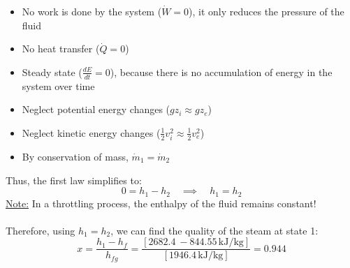 \documentclass[12pt]{article}
\begin{document}
\begin{itemize}
\item No work is done by the system ($\dot{W}=0$), it only reduces the pressure of the fluid
\item No heat transfer ($\dot{Q}=0$)
\item Steady state ($\frac{dE}{dt}=0$), because there is no accumulation of energy in the system over time
\item Neglect potential energy changes ($g z_i \approx g z_e$)
\item Neglect kinetic energy changes ($\frac{1}{2}v_i^2 \approx \frac{1}{2}v_e^2$)
\item By conservation of mass, $\dot{m}_1 = \dot{m}_2$
\end{itemize}
Thus, the first law simplifies to:
\[0 = h_1 - h_2 \quad \implies \quad h_1 = h_2\]
\underline{Note:} In a throttling process, the enthalpy of the fluid remains constant!\\\\
Therefore, using $h_1 = h_2$, we can find the quality of the steam at state 1:
\[x = \frac{h_1 - h_f}{h_{fg}} = \frac{[2682.4\ - 844.55\,\text{kJ}/\text{kg}]}{[1946.4\,\text{kJ}/\text{kg}]} = \boxed{0.944}\]
\end{document}
